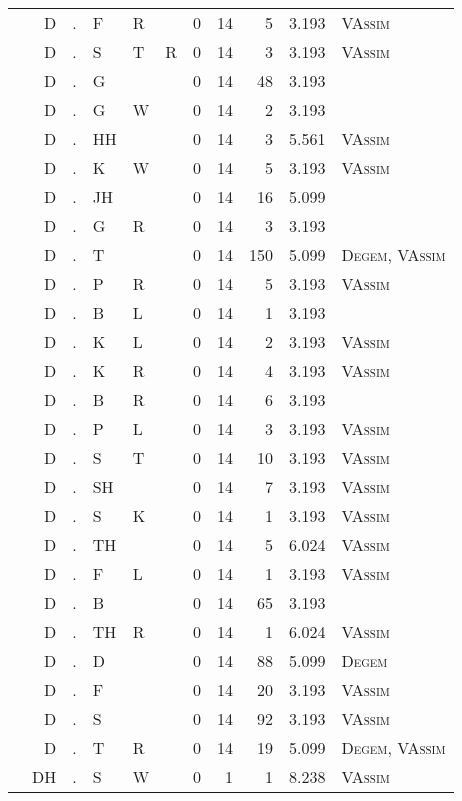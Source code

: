 \begin{longtable}{r@{ } r@{ } c@{ } l@{ } l@{ } l@{ } r r r r l }
 & D & . & F & R &  & 0 & 14 & 5 & 3.193 & \textsc{VAssim} \\
 & D & . & S & T & R & 0 & 14 & 3 & 3.193 & \textsc{VAssim} \\
 & D & . & G &  &  & 0 & 14 & 48 & 3.193 &  \\
 & D & . & G & W &  & 0 & 14 & 2 & 3.193 &  \\
 & D & . & HH &  &  & 0 & 14 & 3 & 5.561 & \textsc{VAssim} \\
 & D & . & K & W &  & 0 & 14 & 5 & 3.193 & \textsc{VAssim} \\
 & D & . & JH &  &  & 0 & 14 & 16 & 5.099 &  \\
 & D & . & G & R &  & 0 & 14 & 3 & 3.193 &  \\
 & D & . & T &  &  & 0 & 14 & 150 & 5.099 & \textsc{Degem}, \textsc{VAssim} \\
 & D & . & P & R &  & 0 & 14 & 5 & 3.193 & \textsc{VAssim} \\
 & D & . & B & L &  & 0 & 14 & 1 & 3.193 &  \\
 & D & . & K & L &  & 0 & 14 & 2 & 3.193 & \textsc{VAssim} \\
 & D & . & K & R &  & 0 & 14 & 4 & 3.193 & \textsc{VAssim} \\
 & D & . & B & R &  & 0 & 14 & 6 & 3.193 &  \\
 & D & . & P & L &  & 0 & 14 & 3 & 3.193 & \textsc{VAssim} \\
 & D & . & S & T &  & 0 & 14 & 10 & 3.193 & \textsc{VAssim} \\
 & D & . & SH &  &  & 0 & 14 & 7 & 3.193 & \textsc{VAssim} \\
 & D & . & S & K &  & 0 & 14 & 1 & 3.193 & \textsc{VAssim} \\
 & D & . & TH &  &  & 0 & 14 & 5 & 6.024 & \textsc{VAssim} \\
 & D & . & F & L &  & 0 & 14 & 1 & 3.193 & \textsc{VAssim} \\
 & D & . & B &  &  & 0 & 14 & 65 & 3.193 &  \\
 & D & . & TH & R &  & 0 & 14 & 1 & 6.024 & \textsc{VAssim} \\
 & D & . & D &  &  & 0 & 14 & 88 & 5.099 & \textsc{Degem} \\
 & D & . & F &  &  & 0 & 14 & 20 & 3.193 & \textsc{VAssim} \\
 & D & . & S &  &  & 0 & 14 & 92 & 3.193 & \textsc{VAssim} \\
 & D & . & T & R &  & 0 & 14 & 19 & 5.099 & \textsc{Degem}, \textsc{VAssim} \\
 & DH & . & S & W &  & 0 & 1 & 1 & 8.238 & \textsc{VAssim} \\

\end{longtable}
